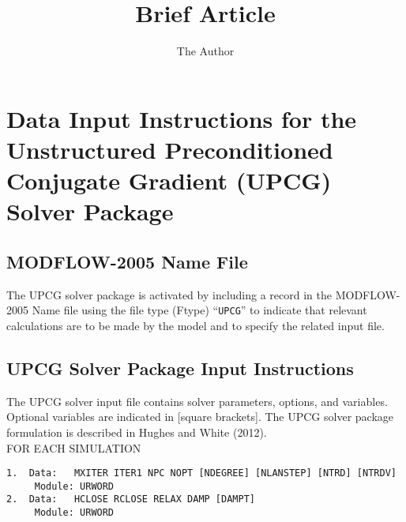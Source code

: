 \documentclass[12pt]{article} %
\title{Brief Article}
\author{The Author}
\begin{document}
\section*{Data Input Instructions for the Unstructured Preconditioned Conjugate Gradient (UPCG) Solver Package}

\subsection*{MODFLOW-2005 Name File}
The UPCG solver package is activated by including a record in the MODFLOW-2005 Name file using the file type (Ftype) ``\texttt{UPCG}'' to indicate that relevant calculations are to be made by the model and to specify the related input file.

\subsection*{UPCG Solver Package Input Instructions}
The UPCG solver input file contains solver parameters, options, and variables. Optional variables are indicated in [square brackets]. The UPCG solver package formulation is described in Hughes and White (2012).
\\

\noindent FOR EACH SIMULATION
\begin{verbatim}
1.  Data:   MXITER ITER1 NPC NOPT [NDEGREE] [NLANSTEP] [NTRD] [NTRDV]
     Module: URWORD
2.  Data:   HCLOSE RCLOSE RELAX DAMP [DAMPT]
     Module: URWORD
\end{verbatim}
\end{document}
